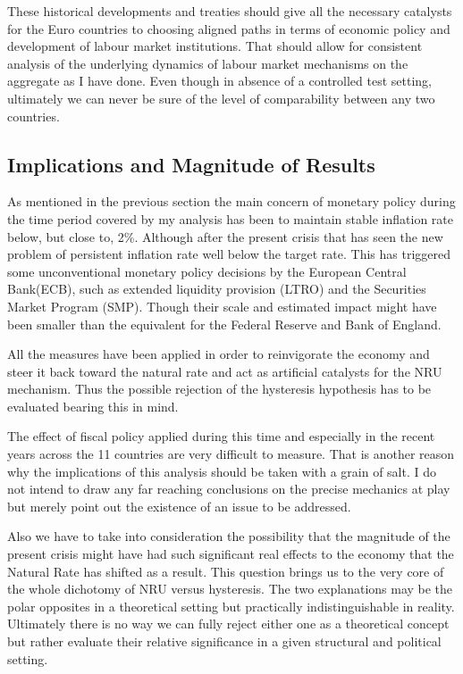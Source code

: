 \documentclass[12pt,a4paper,english]{article}
\begin{document}
These historical developments and treaties should give all the necessary catalysts for the Euro countries to choosing aligned paths in terms of economic policy and development of labour market institutions. That should allow for consistent analysis of the underlying dynamics of labour market mechanisms on the aggregate as I have done. Even though in absence of a controlled test setting, ultimately we can never be sure of the level of comparability between any two countries.


\vspace{2cm}

\subsection{Implications and Magnitude of Results}

As mentioned in the previous section the main concern of monetary policy during the time period covered by my analysis has been to maintain stable inflation rate below, but close to, 2\%. Although after the present crisis that has seen the new problem of persistent inflation rate well below the target rate. This has triggered some unconventional monetary policy decisions by the European Central Bank(ECB), such as extended  liquidity  provision (LTRO) and the Securities Market Program (SMP). Though their scale and estimated impact might have been smaller than the equivalent for the Federal Reserve and Bank of England. \citep{pattipeilohy2013, eser2016}

All the measures have been applied in order to reinvigorate the economy and steer it back toward the natural rate and act as artificial catalysts for the NRU mechanism. Thus the possible rejection of the hysteresis hypothesis has to be evaluated bearing this in mind.

The effect of fiscal policy applied during this time and especially in the recent years across the 11 countries are very difficult to measure. That is another reason why the implications of this analysis should be taken with a grain of salt. I do not intend to draw any far reaching conclusions on the precise mechanics at play but merely point out the existence of an issue to be addressed.

Also we have to take into consideration the possibility that the magnitude of the present crisis might have had such significant real effects to the economy that the Natural Rate has shifted as a result. This question brings us to the very core of the whole dichotomy of NRU versus hysteresis. The two explanations may be the polar opposites in a theoretical setting but practically indistinguishable in reality. Ultimately there is no way we can fully reject either one as a theoretical concept but rather evaluate their relative significance in a given structural and political setting.
\end{document}
